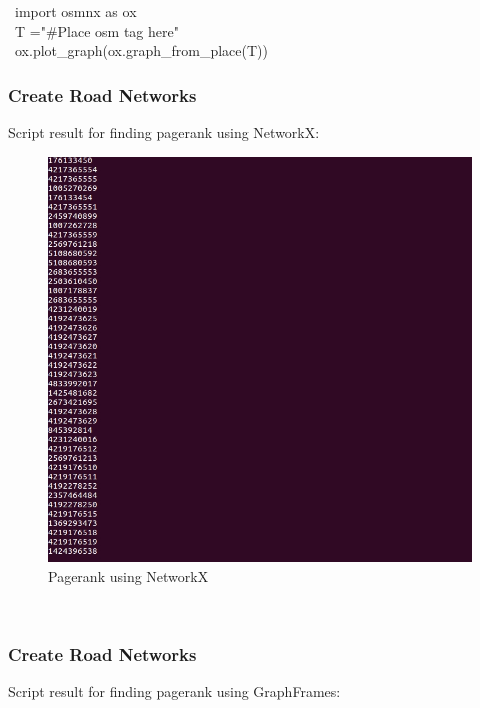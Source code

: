 \begin{description}
	
	\item [\ import osmnx as ox]
	\item [\ T ="#Place osm tag here"]
	\item [\ ox.plot\_graph(ox.graph\_from\_place(T))]
	
\end{description}

\subsubsection{Create Road Networks}
Script result for finding pagerank using NetworkX:

\begin{figure}[!ht]
	\centering
	\includegraphics[scale=0.5]{input/images/pg.jpg}              
	\caption{Pagerank using NetworkX}
	\hspace{-1.5em}
\end{figure}\\

\subsubsection{Create Road Networks}
Script result for finding pagerank using GraphFrames:

